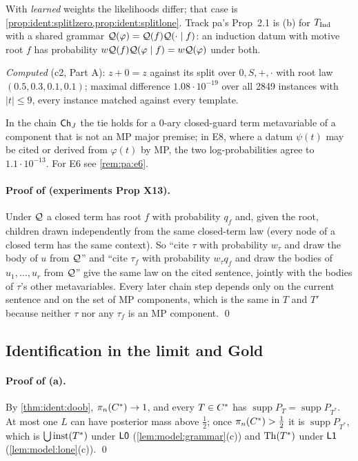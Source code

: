 With \emph{learned} weights the likelihoods differ; that case is \cref{prop:ident:splitlzero,prop:ident:splitlone}. Track pa's Prop~2.1 is (b) for $T_{\mathrm{Ind}}$ with a shared grammar $\mathcal{Q}(\varphi)=\mathcal{Q}(f)\mathcal{Q}(\cdot\mid f)$: an induction datum with motive root $f$ has probability $w\mathcal{Q}(f)\mathcal{Q}(\varphi\mid f)=w\mathcal{Q}(\varphi)$ under both.

\emph{Computed} (c2, Part A): $z+0=z$ against its split over $0,S,+,\cdot$ with root law $(0.5,0.3,0.1,0.1)$; maximal difference $1.08\cdot10^{-19}$ over all 2849 instances with $|t|\le9$, every instance matched against every template.

\begin{remark}\label{rem:ident:splitsL1}
In the chain $\mathsf{Ch}_{J}$ the tie holds for a $0$-ary closed-guard term metavariable of a component that is not an MP major premise; in E8, where a datum $\psi(t)$ may be cited or derived from $\varphi(t)$ by MP, the two log-probabilities agree to $1.1\cdot10^{-13}$. For E6 see \cref{rem:pa:e6}.
\end{remark}

\paragraph{Proof of  (experiments Prop X13).} Under $\mathcal{Q}$ a closed term has root $f$ with probability $q_f$ and, given the root, children drawn independently from the same closed-term law (every node of a closed term has the same context). So ``cite $\tau$ with probability $w_\tau$ and draw the body of $u$ from $\mathcal{Q}$'' and ``cite $\tau_f$ with probability $w_\tau q_f$ and draw the bodies of $u_1,\dots,u_r$ from $\mathcal{Q}$'' give the same law on the cited sentence, jointly with the bodies of $\tau$'s other metavariables. Every later chain step depends only on the current sentence and on the set of MP components, which is the same in $T$ and $T'$ because neither $\tau$ nor any $\tau_f$ is an MP component. \qed

\subsection{Identification in the limit and Gold}\label{app:ident:gold}

\paragraph{Proof of (a).} By \cref{thm:ident:doob}, $\pi_n(C^{*})\to1$, and every $T\in C^{*}$ has $\operatorname{supp}P_T=\operatorname{supp}P_{T^*}$. At most one $L$ can have posterior mass above $\frac12$; once $\pi_n(C^{*})>\frac12$ it is $\operatorname{supp}P_{T^*}$, which is $\bigcup\mathrm{inst}(T^*)$ under $\mathord{\mathsf{L0}}$ (\cref{lem:model:grammar}(c)) and $\mathrm{Th}(T^*)$ under $\mathord{\mathsf{L1}}$ (\cref{lem:model:lone}(c)). \qed

